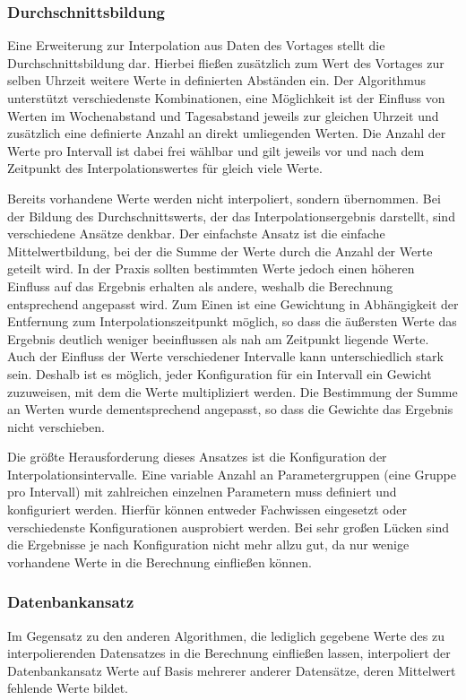 
\subsubsection{Durchschnittsbildung}
Eine Erweiterung zur Interpolation aus Daten des Vortages stellt die Durchschnittsbildung dar. Hierbei fließen zusätzlich zum Wert des Vortages zur selben Uhrzeit weitere Werte in definierten Abständen ein. Der Algorithmus unterstützt verschiedenste Kombinationen, eine Möglichkeit ist der Einfluss von Werten im Wochenabstand und Tagesabstand jeweils zur gleichen Uhrzeit und zusätzlich eine definierte Anzahl an direkt umliegenden Werten. Die Anzahl der Werte pro Intervall ist dabei frei wählbar und gilt jeweils vor und nach dem Zeitpunkt des Interpolationswertes für gleich viele Werte.

Bereits vorhandene Werte werden nicht interpoliert, sondern übernommen. Bei der Bildung des Durchschnittswerts, der das Interpolationsergebnis darstellt, sind verschiedene Ansätze denkbar. Der einfachste Ansatz ist die einfache Mittelwertbildung, bei der die Summe der Werte durch die Anzahl der Werte geteilt wird. In der Praxis sollten bestimmten Werte jedoch einen höheren Einfluss auf das Ergebnis erhalten als andere, weshalb die Berechnung entsprechend angepasst wird.
Zum Einen ist eine Gewichtung in Abhängigkeit der Entfernung zum Interpolationszeitpunkt möglich, so dass die äußersten Werte das Ergebnis deutlich weniger beeinflussen als nah am Zeitpunkt liegende Werte.
Auch der Einfluss der Werte verschiedener Intervalle kann unterschiedlich stark sein. Deshalb ist es möglich, jeder Konfiguration für ein Intervall ein Gewicht zuzuweisen, mit dem die Werte multipliziert werden. Die Bestimmung der Summe an Werten wurde dementsprechend angepasst, so dass die Gewichte das Ergebnis nicht verschieben.

Die größte Herausforderung dieses Ansatzes ist die Konfiguration der Interpolationsintervalle. Eine variable Anzahl an Parametergruppen (eine Gruppe pro Intervall) mit zahlreichen einzelnen Parametern muss definiert und konfiguriert werden. Hierfür können entweder Fachwissen eingesetzt oder verschiedenste Konfigurationen ausprobiert werden.
Bei sehr großen Lücken sind die Ergebnisse je nach Konfiguration nicht mehr allzu gut, da nur wenige vorhandene Werte in die Berechnung einfließen können.

\subsubsection{Datenbankansatz}
Im Gegensatz zu den anderen Algorithmen, die lediglich gegebene Werte des zu interpolierenden Datensatzes in die Berechnung einfließen lassen, interpoliert der Datenbankansatz Werte auf Basis mehrerer anderer Datensätze, deren Mittelwert fehlende Werte bildet.

